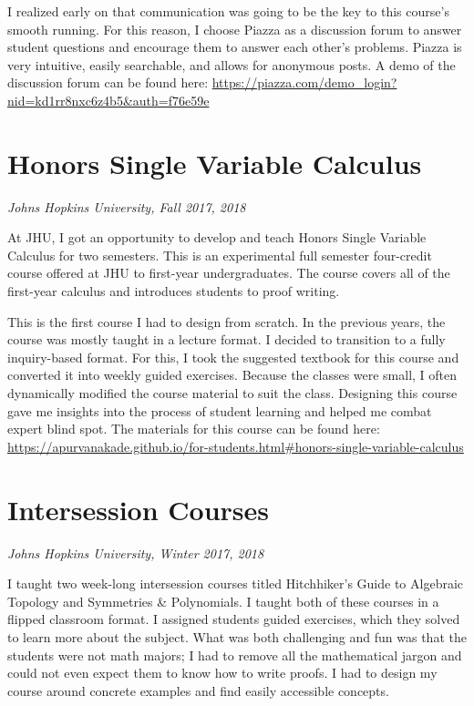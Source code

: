 \documentclass[
]{report}
\begin{document}
\begin{itemize}
  I realized early on that communication was going to be the key to this course's smooth running.
  For this reason, I choose Piazza as a discussion forum to answer student questions and encourage them to answer each other's problems.
  Piazza is very intuitive, easily searchable, and allows for anonymous posts.
  A demo of the discussion forum can be found here: \url{https://piazza.com/demo_login?nid=kd1rr8nxc6z4b5\&auth=f76e59e}
\end{itemize}

\hypertarget{honors-single-variable-calculus}{%
\section{Honors Single Variable Calculus}\label{honors-single-variable-calculus}}

\emph{Johns Hopkins University, Fall 2017, 2018}

At JHU, I got an opportunity to develop and teach Honors Single Variable Calculus for two semesters.
This is an experimental full semester four-credit course offered at JHU to first-year undergraduates.
The course covers all of the first-year calculus and introduces students to proof writing.

This is the first course I had to design from scratch.
In the previous years, the course was mostly taught in a lecture format.
I decided to transition to a fully inquiry-based format.
For this, I took the suggested textbook for this course and converted it into weekly guided exercises.
Because the classes were small, I often dynamically modified the course material to suit the class.
Designing this course gave me insights into the process of student learning and helped me combat expert blind spot.
The materials for this course can be found here: \url{https://apurvanakade.github.io/for-students.html\#honors-single-variable-calculus}

\hypertarget{intersession-courses}{%
\section{Intersession Courses}\label{intersession-courses}}

\emph{Johns Hopkins University, Winter 2017, 2018}

I taught two week-long intersession courses titled Hitchhiker's Guide to Algebraic Topology and Symmetries \& Polynomials.
I taught both of these courses in a flipped classroom format.
I assigned students guided exercises, which they solved to learn more about the subject.
What was both challenging and fun was that the students were not math majors; I had to remove all the mathematical jargon and could not even
expect them to know how to write proofs.
I had to design my course around concrete examples and find easily accessible concepts.
\end{document}
